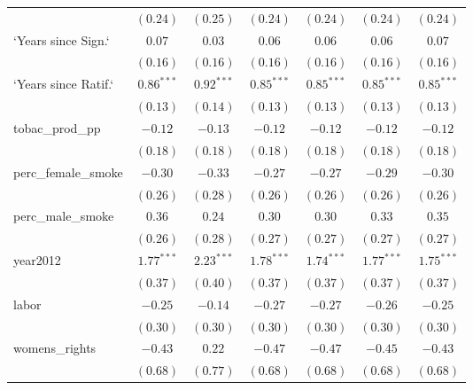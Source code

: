 \begin{table}[!h]
\begin{center}
\begin{tabular}{l c c c c c c }
                        & $(0.24)$     & $(0.25)$     & $(0.24)$     & $(0.24)$     & $(0.24)$     & $(0.24)$     \\
`Years since Sign.`     & $0.07$       & $0.03$       & $0.06$       & $0.06$       & $0.06$       & $0.07$       \\
                        & $(0.16)$     & $(0.16)$     & $(0.16)$     & $(0.16)$     & $(0.16)$     & $(0.16)$     \\
`Years since Ratif.`    & $0.86^{***}$ & $0.92^{***}$ & $0.85^{***}$ & $0.85^{***}$ & $0.85^{***}$ & $0.85^{***}$ \\
                        & $(0.13)$     & $(0.14)$     & $(0.13)$     & $(0.13)$     & $(0.13)$     & $(0.13)$     \\
tobac\_prod\_pp         & $-0.12$      & $-0.13$      & $-0.12$      & $-0.12$      & $-0.12$      & $-0.12$      \\
                        & $(0.18)$     & $(0.18)$     & $(0.18)$     & $(0.18)$     & $(0.18)$     & $(0.18)$     \\
perc\_female\_smoke     & $-0.30$      & $-0.33$      & $-0.27$      & $-0.27$      & $-0.29$      & $-0.30$      \\
                        & $(0.26)$     & $(0.28)$     & $(0.26)$     & $(0.26)$     & $(0.26)$     & $(0.26)$     \\
perc\_male\_smoke       & $0.36$       & $0.24$       & $0.30$       & $0.30$       & $0.33$       & $0.35$       \\
                        & $(0.26)$     & $(0.28)$     & $(0.27)$     & $(0.27)$     & $(0.27)$     & $(0.27)$     \\
year2012                & $1.77^{***}$ & $2.23^{***}$ & $1.78^{***}$ & $1.74^{***}$ & $1.77^{***}$ & $1.75^{***}$ \\
                        & $(0.37)$     & $(0.40)$     & $(0.37)$     & $(0.37)$     & $(0.37)$     & $(0.37)$     \\
labor                   & $-0.25$      & $-0.14$      & $-0.27$      & $-0.27$      & $-0.26$      & $-0.25$      \\
                        & $(0.30)$     & $(0.30)$     & $(0.30)$     & $(0.30)$     & $(0.30)$     & $(0.30)$     \\
womens\_rights          & $-0.43$      & $0.22$       & $-0.47$      & $-0.47$      & $-0.45$      & $-0.43$      \\
                        & $(0.68)$     & $(0.77)$     & $(0.68)$     & $(0.68)$     & $(0.68)$     & $(0.68)$     \\

\end{tabular}
\end{center}
\end{table}
